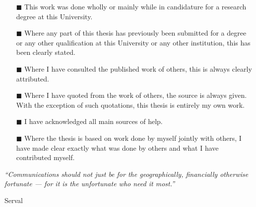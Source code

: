 \documentclass[a4paper, 11pt, oneside]{Thesis}  %
\begin{document}
\begin{itemize} 
\item[\tiny{$\blacksquare$}] This work was done wholly or mainly while in candidature for a research degree at this University.
 
\item[\tiny{$\blacksquare$}] Where any part of this thesis has previously been submitted for a degree or any other qualification at this University or any other institution, this has been clearly stated.
 
\item[\tiny{$\blacksquare$}] Where I have consulted the published work of others, this is always clearly attributed.
 
\item[\tiny{$\blacksquare$}] Where I have quoted from the work of others, the source is always given. With the exception of such quotations, this thesis is entirely my own work.
 
\item[\tiny{$\blacksquare$}] I have acknowledged all main sources of help.
 
\item[\tiny{$\blacksquare$}] Where the thesis is based on work done by myself jointly with others, I have made clear exactly what was done by others and what I have contributed myself.
\\
\end{itemize}
 
\clearpage  %

\pagestyle{empty}  %

\null\vfill
\textit{``Communications should not just be for the geographically, financially otherwise fortunate — for it is the unfortunate who need it most.''}

\begin{flushright}
Serval
\end{flushright}

\vfill\vfill\vfill\vfill\vfill\vfill\null
\clearpage  %
\end{document}
